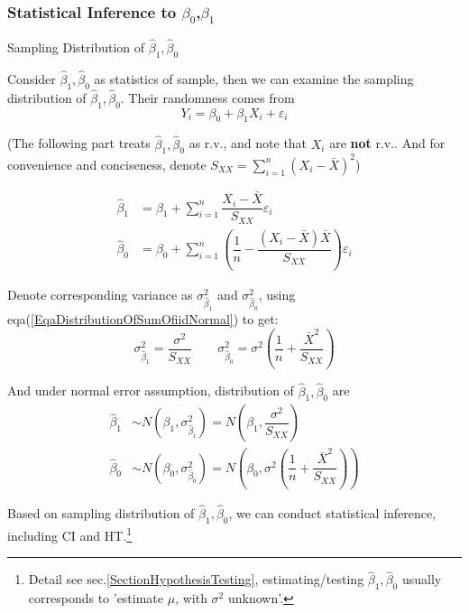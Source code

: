 \subsubsection{Statistical Inference to $ \beta _0 $,$ \beta _1 $}

\begin{point}
    Sampling Distribution of $ \hat{\beta} _1,\hat{\beta} _0  $
\end{point}

    Consider $ \hat{\beta} _1,\hat{\beta} _0 $ as statistics of sample, then we can examine the sampling distribution of $  \hat{\beta} _1,\hat{\beta} _0 $. Their randomness comes from
    \[
        Y_i=\beta_0+\beta_1X_i+\varepsilon _i 
    \]
    
    

    (The following part treats $\hat{\beta} _1,\hat{\beta} _0 $ as r.v., and note that $ X_i $ are \textbf{not }r.v.. And  for convenience and conciseness, denote $ S_{XX}={\displaystyle\sum_{i=1}^n(X_i-\bar{X})^2} $)

   
\begin{align*}
        \hat{\beta }_1&=\beta _1+\sum_{i=1}^n\dfrac{X_i-\bar{X}}{S_{XX}}\varepsilon _i\\
        \hat{\beta }_0&=\beta _0+\sum_{i=1}^n\left(\dfrac{1}{n}-\dfrac{(X_i-\bar{X})\bar{X}}{S_{XX}}\right)\varepsilon _i
\end{align*}
 
    Denote corresponding variance as $ \sigma^2_{\hat{\beta}_1} $ and $ \sigma^2_{\hat{\beta}_0} $, using eqa(\ref{EqaDistributionOfSumOfiidNormal}) to get:
    \[
        \sigma^2_{\hat{\beta}_1}= \dfrac{\sigma^2}{S_{XX}}\qquad \sigma^2_{\hat{\beta}_0}=\sigma^2(\dfrac{1}{n}+\dfrac{\bar{X}^2}{S_{XX}})
    \] 
    
     And under normal error assumption, distribution of $ \hat{\beta} _1,\hat{\beta} _0  $ are
    \begin{align*}
        \hat{\beta }_1&\sim N(\beta _1,\sigma^2_{\hat{\beta}_1}) =N(\beta_1,\dfrac{\sigma^2}{S_{XX}})\\
        \hat{\beta}_0&\sim N(\beta_0,\sigma^2_{\hat{\beta }_0}) =N(\beta_0,\sigma^2(\dfrac{1}{n}+\dfrac{\bar{X}^2}{S_{XX}}))
    \end{align*}
    
    Based on sampling distribution of $ \hat{\beta} _1,\hat{\beta} _0  $, we can conduct statistical inference, including CI and HT.\footnote{Detail see sec.\ref{SectionHypothesisTesting}, estimating/testing $ \hat{\beta} _1,\hat{\beta} _0  $ usually corresponds to 'estimate $ \mu $, with $ \sigma^2 $ unknown'.}
    
